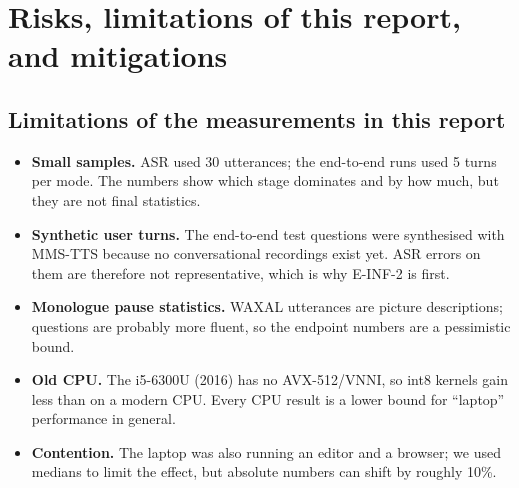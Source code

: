 \section{Risks, limitations of this report, and mitigations}
\label{sec:risks}

\subsection{Limitations of the measurements in this report}
\begin{itemize}
  \item \textbf{Small samples.} ASR used 30 utterances; the end-to-end runs used 5 turns per mode. The
  numbers show which stage dominates and by how much, but they are not final statistics.
  \item \textbf{Synthetic user turns.} The end-to-end test questions were synthesised with MMS-TTS
  because no conversational recordings exist yet. ASR errors on them are therefore not representative,
  which is why E-INF-2 is first.
  \item \textbf{Monologue pause statistics.} WAXAL utterances are picture descriptions; questions are
  probably more fluent, so the endpoint numbers are a pessimistic bound.
  \item \textbf{Old CPU.} The i5-6300U (2016) has no AVX-512/VNNI, so int8 kernels gain less than on a
  modern CPU. Every CPU result is a lower bound for ``laptop'' performance in general.
  \item \textbf{Contention.} The laptop was also running an editor and a browser; we used medians to
  limit the effect, but absolute numbers can shift by roughly 10\%.
\end{itemize}

